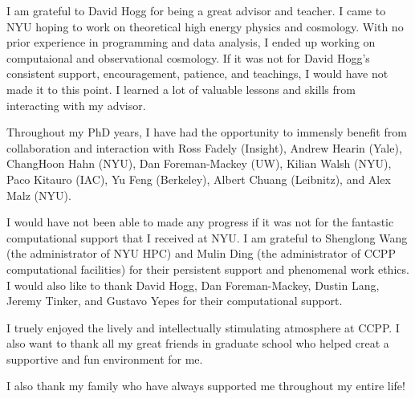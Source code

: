 I am grateful to David Hogg for being a great advisor and teacher. 
I came to NYU hoping to work on theoretical high energy physics and cosmology.
With no prior experience in programming and data analysis, I ended up working on 
computaional and observational cosmology. If it was not for David Hogg's consistent support, 
encouragement, patience, and teachings, I would have not made it to 
this point. I learned a lot of valuable lessons and skills from interacting with 
my advisor.

Throughout my PhD years, I have had the opportunity to immensly benefit from collaboration and 
interaction with Ross Fadely (Insight), Andrew Hearin (Yale), ChangHoon Hahn (NYU), 
Dan Foreman-Mackey (UW), Kilian Walsh (NYU), Paco Kitauro (IAC), Yu Feng (Berkeley), 
Albert Chuang (Leibnitz), and Alex Malz (NYU).

I would have not been able to made any progress if it was not for the 
fantastic computational support that I received at NYU. I am grateful to 
Shenglong Wang (the administrator of NYU HPC) and Mulin Ding (the administrator 
of CCPP computational facilities) for their persistent support and 
phenomenal work ethics. I would also like to thank David Hogg, Dan Foreman-Mackey, 
Dustin Lang, Jeremy Tinker, and Gustavo Yepes for their computational support. 

I truely enjoyed the lively and intellectually stimulating atmosphere at CCPP.
I also want to thank all my great friends in graduate school who helped creat a 
supportive and fun environment for me.  

I also thank my family who have always supported me throughout my entire life! 



